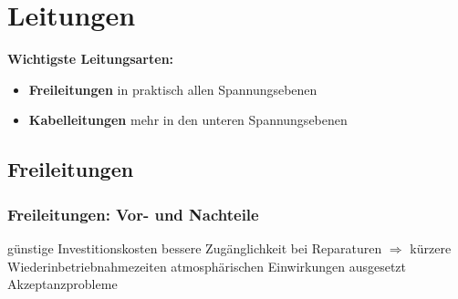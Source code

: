 \section{Leitungen}

    \textbf{Wichtigste Leitungsarten:}
    \begin{itemize}
        \item \textbf{Freileitungen} in praktisch allen Spannungsebenen
        \item \textbf{Kabelleitungen} mehr in den unteren Spannungsebenen
    \end{itemize}

\subsection{Freileitungen}
\subsubsection{Freileitungen: Vor- und Nachteile}
    \begin{itemize}
        \pro günstige Investitionskosten
        \pro bessere Zugänglichkeit bei Reparaturen $\Rightarrow$ kürzere Wiederinbetriebnahmezeiten
    \vspace{1em}
        \con atmosphärischen Einwirkungen ausgesetzt
        \con Akzeptanzprobleme
    \end{itemize}

